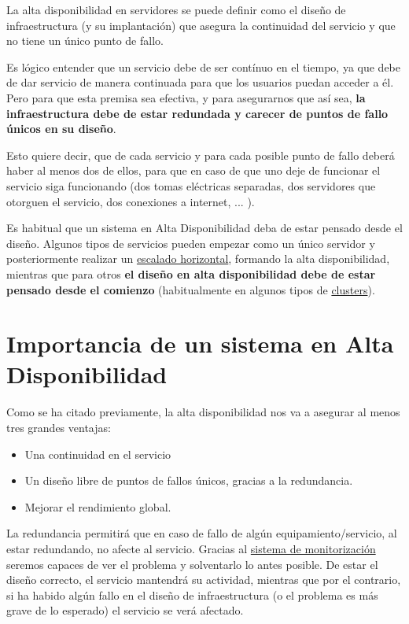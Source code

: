La alta disponibilidad en servidores se puede definir como el diseño de infraestructura (y su implantación) que asegura la continuidad del servicio y que no tiene un único punto de fallo.

Es lógico entender que un servicio debe de ser contínuo en el tiempo, ya que debe de dar servicio de manera continuada para que los usuarios puedan acceder a él. Pero para que esta premisa sea efectiva, y para asegurarnos que así sea, \textbf{la infraestructura debe de estar redundada y carecer de puntos de fallo únicos en su diseño}.

Esto quiere decir, que de cada servicio y para cada posible punto de fallo deberá haber al menos dos de ellos, para que en caso de que uno deje de funcionar el servicio siga funcionando (dos tomas eléctricas separadas, dos servidores que otorguen el servicio, dos conexiones a internet, ... ).

Es habitual que un sistema en Alta Disponibilidad deba de estar pensado desde el diseño. Algunos tipos  de servicios pueden empezar como un único servidor y posteriormente realizar un \hyperlink{escalado_horizontal}{escalado horizontal}, formando la alta disponibilidad, mientras que para otros \textbf{el diseño en alta disponibilidad debe de estar pensado desde el comienzo} (habitualmente en algunos tipos de \hyperlink{cluster}{clusters}).


\section{Importancia de un sistema en Alta Disponibilidad}

Como se ha citado previamente, la alta disponibilidad nos va a asegurar al menos tres grandes ventajas:

\begin{itemize}
    \item Una continuidad en el servicio
    \item Un diseño libre de puntos de fallos únicos, gracias a la redundancia.
    \item Mejorar el rendimiento global.
\end{itemize}

La redundancia permitirá que en caso de fallo de algún equipamiento/servicio, al estar redundando, no afecte al servicio. Gracias al \hyperlink{monitorizacion_de_sgbds}{sistema de monitorización} seremos capaces de ver el problema y solventarlo lo antes posible. De estar el diseño correcto, el servicio mantendrá su actividad, mientras que por el contrario, si ha habido algún fallo en el diseño de infraestructura (o el problema es más grave de lo esperado) el servicio se verá afectado.


